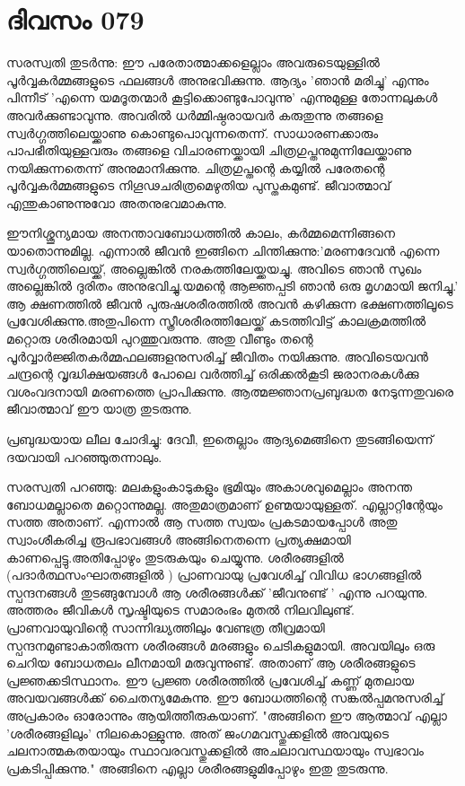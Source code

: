 \newpage
\section{ദിവസം 079}


സരസ്വതി തുടര്‍ന്നു: ഈ പരേതാത്മാക്കളെല്ലാം അവരുടെയുള്ളില്‍ പൂര്‍വ്വകര്‍മ്മങ്ങളുടെ ഫലങ്ങള്‍ അനുഭവിക്കുന്നു. ആദ്യം 'ഞാന്‍ മരിച്ചു' എന്നും പിന്നീട്‌ 'എന്നെ യമദൂതന്മാര്‍ കൂട്ടിക്കൊണ്ടുപോവുന്നു' എന്നുമുള്ള തോന്നലുകള്‍ അവര്‍ക്കുണ്ടാവുന്നു. അവരില്‍ ധര്‍മ്മിഷ്ഠരായവര്‍ കരുതുന്നു തങ്ങളെ സ്വര്‍ഗ്ഗത്തിലെയ്ക്കാണു കൊണ്ടുപൊവുന്നതെന്ന്. സാധാരണക്കാരും പാപഭീതിയുള്ളവരും തങ്ങളെ വിചാരണയ്ക്കായി ചിത്രഗുപ്തനുമുന്നിലേയ്ക്കാണു നയിക്കുന്നതെന്ന് അനുമാനിക്കുന്നു. ചിത്രഗുപ്തന്റെ കയ്യില്‍ പരേതന്റെ പൂര്‍വ്വകര്‍മ്മങ്ങളുടെ നിഗൂഢചരിത്രമെഴുതിയ പുസ്തകമുണ്ട്‌. ജീവാത്മാവ്‌ എന്തുകാണുന്നുവോ അതനുഭവമാകുന്നു. 

ഈനിശ്ശൂന്യമായ അനന്താവബോധത്തില്‍ കാലം, കര്‍മ്മമെന്നിങ്ങനെ യാതൊന്നുമില്ല. എന്നാല്‍ ജീവന്‍ ഇങ്ങിനെ ചിന്തിക്കുന്നു:'മരണദേവന്‍ എന്നെ സ്വര്‍ഗ്ഗത്തിലെയ്ക്ക്‌, അല്ലെങ്കില്‍ നരകത്തിലേയ്ക്കയച്ചു. അവിടെ ഞാന്‍ സുഖം അല്ലെങ്കില്‍ ദുരിതം അനുഭവിച്ചു.യമന്റെ ആജ്ഞപ്പടി ഞാന്‍ ഒരു മൃഗമായി ജനിച്ചു.' ആ ക്ഷണത്തില്‍ ജീവന്‍ പുരുഷശരീരത്തില്‍ അവന്‍ കഴിക്കുന്ന ഭക്ഷണത്തിലൂടെ പ്രവേശിക്കുന്നു.അതുപിന്നെ സ്ത്രീശരീരത്തിലേയ്ക്ക്‌ കടത്തിവിട്ട്‌ കാലക്രമത്തില്‍ മറ്റൊരു ശരീരമായി പുറത്തുവരുന്നു. അതു വീണ്ടും തന്റെ പൂര്‍വ്വാര്‍ജ്ജിതകര്‍മ്മഫലങ്ങളനുസരിച്ച്‌ ജീവിതം നയിക്കുന്നു. അവിടെയവന്‍ ചന്ദ്രന്റെ വൃദ്ധിക്ഷയങ്ങള്‍ പോലെ വര്‍ത്തിച്ച്‌ ഒരിക്കല്‍കൂടി ജരാനരകള്‍ക്കു വശംവദനായി മരണത്തെ പ്രാപിക്കുന്നു. ആത്മജ്ഞാനപ്രബുദ്ധത നേടുന്നതുവരെ ജീവാത്മാവ്‌ ഈ യാത്ര തുടരുന്നു.

പ്രബുദ്ധയായ ലീല ചോദിച്ചു: ദേവീ, ഇതെല്ലാം ആദ്യമെങ്ങിനെ തുടങ്ങിയെന്ന് ദയവായി പറഞ്ഞുതന്നാലും.

സരസ്വതി പറഞ്ഞു: മലകളുംകാടുകളും ഭൂമിയും അകാശവുമെല്ലാം അനന്ത ബോധമല്ലാതെ മറ്റൊന്നുമല്ല. അതുമാത്രമാണ്‌ ഉണ്മയായുള്ളത്‌. എല്ലാറ്റിന്റേയും സത്ത അതാണ്‌. എന്നാല്‍ ആ സത്ത സ്വയം പ്രകടമായപ്പോള്‍ അതു സ്വാംശീകരിച്ച രൂപഭാവങ്ങള്‍ അങ്ങിനെതന്നെ പ്രത്യക്ഷമായി കാണപ്പെട്ടു.അതിപ്പോഴും തുടരുകയും ചെയ്യുന്നു. ശരീരങ്ങളില്‍ (പദാര്‍ത്ഥസംഘാതങ്ങളില്‍ ) പ്രാണവായു പ്രവേശിച്ച്‌ വിവിധ ഭാഗങ്ങളില്‍ സ്പന്ദനങ്ങള്‍  തുടങ്ങുമ്പോള്‍ ആ ശരീരങ്ങള്‍ക്ക്‌ 'ജീവനുണ്ട്‌ ' എന്നു പറയുന്നു. അത്തരം ജീവികള്‍ സൃഷ്ടിയുടെ സമാരംഭം മുതല്‍ നിലവിലുണ്ട്‌. പ്രാണവായുവിന്റെ സാന്നിദ്ധ്യത്തിലും വേണ്ടത്ര തീവ്രമായി സ്പന്ദനമുണ്ടാകാതിരുന്ന ശരീരങ്ങള്‍ മരങ്ങളും ചെടികളുമായി. അവയിലും ഒരു ചെറിയ ബോധതലം ലീനമായി മരുവുന്നുണ്ട്‌. അതാണ്‌ ആ ശരീരങ്ങളുടെ പ്രജ്ഞക്കടിസ്ഥാനം. ഈ പ്രജ്ഞ ശരീരത്തില്‍ പ്രവേശിച്ച്‌ കണ്ണ് മുതലായ അവയവങ്ങള്‍ക്ക്‌ ചൈതന്യമേകുന്നു. ഈ ബോധത്തിന്റെ സങ്കല്‍പ്പമനുസരിച്ച്‌ അപ്രകാരം ഓരോന്നും ആയിത്തീരുകയാണ്‌. "അങ്ങിനെ ഈ ആത്മാവ്‌ എല്ലാ 'ശരീരങ്ങളിലും' നിലകൊള്ളുന്നു. അത്‌ ജംഗമവസ്തുക്കളില്‍ അവയുടെ ചലനാത്മകതയായും സ്ഥാവരവസ്തുക്കളില്‍ അചലാവസ്ഥയായും സ്വഭാവം പ്രകടിപ്പിക്കുന്നു." അങ്ങിനെ എല്ലാ ശരീരങ്ങളുമിപ്പോഴും ഇതു തുടരുന്നു.
